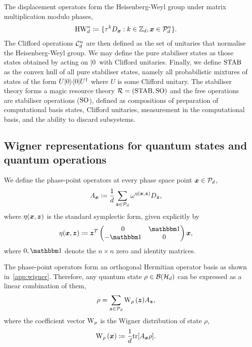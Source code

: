 \documentclass[pra,
aps,
twocolumn,
superscriptaddress,
groupedaddress,
nofootinbib,
reprint
]{revtex4-1}
\begin{document}
The displacement operators form the Heisenberg-Weyl group  under matrix multiplication modulo phases,
\begin{equation}\label{eq:gp}
    {\rm{HW}}_d^n \coloneqq \{ \tau^k D_{\bmx}: k \in \mathbb{Z}_d, \bmx \in \cal{P}_d^n\}.
\end{equation}
The Clifford operations $ \cal{C}_d^n $ are then defined as the set of unitaries that normalise the Heisenberg-Weyl group. We may define the pure stabiliser states as those states obtained by acting on $|0\>$ with Clifford unitaries. Finally, we define $\stab$ as the convex hull of all pure stabiliser states, namely all probabilistic mixtures of states of the form $U|0\>\<0|U^\dagger$ where $U$ is some Clifford unitary. The stabiliser theory forms a magic resource theory $\R = (\stab, \so)$
and the free operations are stabiliser operations ($\so$), defined as compositions of preparation of computational basis states, Clifford unitaries, measurement in the computational basis, and the ability to discard subsystems.

\subsection{Wigner representations for quantum states and quantum operations}\label{sec:wigner}

We define the phase-point operators at every phase space point $\bmx \in \cal{P}_d$,
\begin{align}
	A_{\bmx} \coloneqq \frac{1}{d} \sum_{\bmz \in \cal{P}_d} \omega^{\eta(\bmx, \bmz)} D_{\bmz}, \label{eq:ax}
\end{align}
where $\eta(\bmx, \bmz)$ is the standard symplectic form, given explicitly by
\begin{equation}
	\eta(\bmx, \bmz) \coloneqq \bmz^T \begin{pmatrix}
		0  & \id \\ %
		-\id & 0 \\ %
	\end{pmatrix} \bmx,
\end{equation}
where $0, \id$ denote the $n\times n$ zero and identity matrices.

The phase-point operators form an orthogonal Hermitian operator basis as shown in~\cref{app:wigner}.
Therefore, any quantum state $\rho \in \cal{B}(\cal{H}_d)$ can be expressed as a linear combination of them,
\begin{equation}
    \rho = \sum_{\bmz \in \cal{P}_d} \W[\bmz]{\rho} A_{\bmz},
\end{equation}
where the coefficient vector $\W{\rho}$ is the Wigner distribution of state $\rho$,
\begin{equation}\label{eq:wstate}
    \W[\bmx]{\rho} \coloneqq \frac{1}{d}\tr[A_{\bmx} \rho].
\end{equation}
\end{document}
